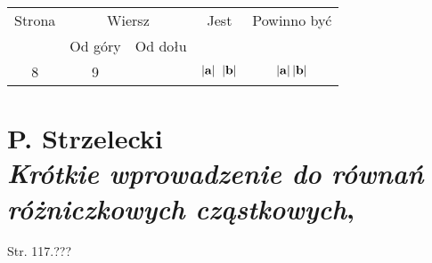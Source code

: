 \documentclass[a4paper,11pt]{article}
\numberwithin{equation}{section}
\begin{document}
\VerSpaceFour










\begin{center}

  \begin{tabular}{|c|c|c|c|c|}
    \hline
    Strona & \multicolumn{2}{c|}{Wiersz} & Jest
                              & Powinno być \\ \cline{2-3}
    & Od góry & Od dołu & & \\
    \hline
    8   &  9 & & $| \mathbf{a} | \;\; | \mathbf{b} |$
           & $| \mathbf{a} | \, | \mathbf{b} |$ \\
    \hline
  \end{tabular}

\end{center}

\VerSpaceTwo


















\newpage

\section{P. Strzelecki \\
  \textit{Krótkie wprowadzenie do równań różniczkowych cząstkowych},
  \cite{StrzeleckiKrotkieWprowadzenieETC2006}}



Str. 117.???





\end{document}
